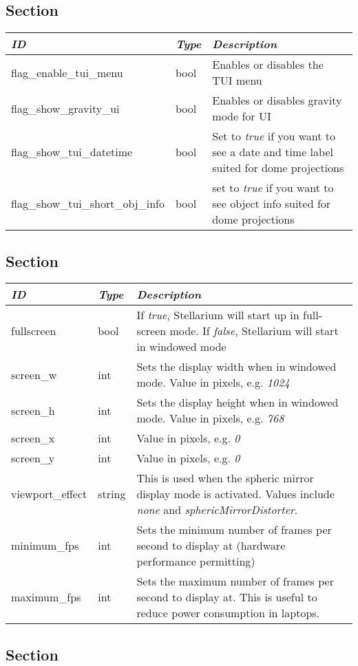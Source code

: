 \subsection{Section }\label{section-tui}

\begin{longtabu} to \textwidth {l|l|X}
\toprule
\emph{ID} & \emph{Type} & \emph{Description}\tabularnewline
\midrule
flag\_enable\_tui\_menu & bool & Enables or disables the TUI menu\tabularnewline
\midrule
flag\_show\_gravity\_ui & bool & Enables or disables gravity mode for UI\tabularnewline
\midrule
flag\_show\_tui\_datetime & bool & Set to \emph{true} if you want to see a date and time label suited for dome projections\tabularnewline
\midrule
flag\_show\_tui\_short\_obj\_info & bool & set to \emph{true} if you want to see object info suited for dome projections\tabularnewline
\bottomrule
\end{longtabu}

\subsection{Section }\label{section-video}

\begin{longtabu} to \textwidth {l|l|X}
\toprule
\emph{ID} & \emph{Type} & \emph{Description}\tabularnewline
\midrule
fullscreen & bool & If \emph{true}, Stellarium will start
up in full-screen mode. If \emph{false}, Stellarium will start in
windowed mode\tabularnewline
\midrule
screen\_w & int & Sets the display width when in windowed mode. Value in pixels, e.g. \emph{1024}\tabularnewline
\midrule
screen\_h & int & Sets the display height when in windowed mode. Value in pixels, e.g. \emph{768}\tabularnewline
\midrule
screen\_x & int & Value in pixels, e.g. \emph{0}\tabularnewline
\midrule
screen\_y & int & Value in pixels, e.g. \emph{0}\tabularnewline
\midrule
viewport\_effect & string & This is used when the spheric mirror display mode is activated. Values include \emph{none} and \emph{sphericMirrorDistorter}.\tabularnewline
\midrule
minimum\_fps & int & Sets the minimum number of frames per second to display at (hardware performance permitting)\tabularnewline
\midrule
maximum\_fps & int & Sets the maximum number of frames per second to display at. This is useful to reduce power consumption in laptops.\tabularnewline
\bottomrule
\end{longtabu}

\subsection{Section }\label{section-viewing}

